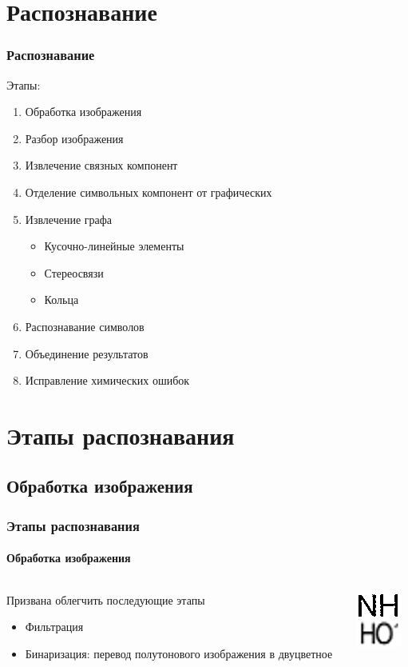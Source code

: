 \section{Распознавание}

\begin{frame}
  \frametitle{Распознавание}
  Этапы:
  \begin{enumerate}
    \item Обработка изображения
    \item Разбор изображения
    \item Извлечение связных компонент
    \item Отделение символьных компонент от графических
    \item Извлечение графа
      \begin{itemize}
        \item Кусочно-линейные элементы 
        \item Стереосвязи
        \item Кольца
      \end{itemize}
    \item Распознавание символов
    \item Объединение результатов
    \item Исправление химических ошибок
  \end{enumerate}
\end{frame}

\section{Этапы распознавания}
\subsection{Обработка изображения}

\begin{frame}
  \frametitle{Этапы распознавания}
  \framesubtitle{Обработка изображения}
  \begin{columns}
      \begin{column}{0.5\textwidth}
         Призвана облегчить последующие этапы 
        \begin{itemize}
         \item Фильтрация
         \item Бинаризация: перевод полутонового изображения в двуцветное
         \end{itemize}
      \end{column}
      \begin{column}{0.5\textwidth}
      \includegraphics[scale=2.5]{media/bad.png}
      \end{column}
   \end{columns}
\end{frame}

